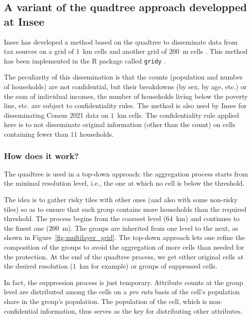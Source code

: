 \subsection{A variant of the quadtree approach developped at Insee}\label{sec:variante_insee}


Insee has developed a method based on the quadtree to disseminate data from tax sources on a grid of $1$~km cells and another grid of $200$~m cells \citep{Branchu_Costemalle_Fontaine_2018}. This method has been implemented in the R package called \texttt{gridy} \citep{gridy}. 

The peculiarity of this dissemination is that the counts (population and number of households) are not confidential, but their breakdowns (by sex, by age, etc.) or the sum of individual incomes, the number of households living below the poverty line, etc. are subject to confidentiality rules. The method is also used by Insee for disseminating Census 2021 data on $1$~km cells. The confidentiality rule applied here is to not disseminate original information (other than the count) on cells containing fewer than $11$ households.

\subsubsection{How does it work?}

The quadtree is used in a top-down approach: the aggregation process starts from the minimal resolution level, i.e., the one at which no cell is below the threshold.

The idea is to gather risky tiles with other ones (and also with some non-risky tiles) so as to ensure that each group contains more households than the required threshold. The process begins from the coarsest level ($64$~km) and continues to the finest one ($200$~m). The groups are inherited from one level to the next, as shown in Figure~\ref{fig:multilayer_grid}. The top-down approach lets one refine the composition of the groups to avoid the aggregation of more cells than needed for the protection. At the end of the quadtree process, we get either original cells at the desired resolution ($1$~km for example) or groups of suppressed cells.

In fact, the suppression process is just temporary. Attribute counts at the group level are distributed among the cells on a \textit{pro rata} basis of the cell's population share in the group's population. The population of the cell, which is non-confidential information, thus serves as the key for distributing other attributes.

